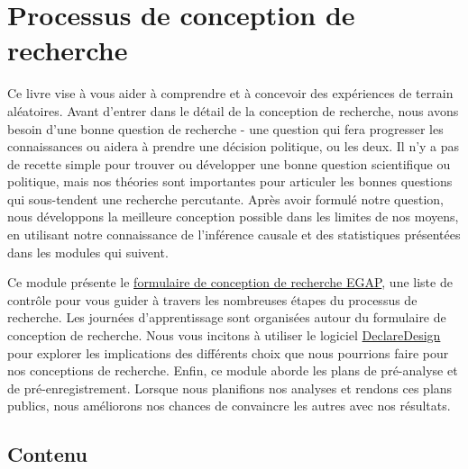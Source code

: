 \documentclass[12pt,]{book}
\begin{document}
\hypertarget{processus-de-conception-de-recherche}{%
\chapter{Processus de conception de recherche}\label{processus-de-conception-de-recherche}}

Ce livre vise à vous aider à comprendre et à concevoir des expériences de terrain aléatoires. Avant d'entrer dans le détail de la conception de recherche, nous avons besoin d'une bonne question de recherche - une question qui fera progresser les connaissances ou aidera à prendre une décision politique, ou les deux. Il n'y a pas de recette simple pour trouver ou développer une bonne question scientifique ou politique, mais nos théories sont importantes pour articuler les bonnes questions qui sous-tendent une recherche percutante. Après avoir formulé notre question, nous développons la meilleure conception possible dans les limites de nos moyens, en utilisant notre connaissance de l'inférence causale et des statistiques présentées dans les modules qui suivent.

Ce module présente le \href{https://egap.github.io/learningdays-resources/Exercises/design-form.Rmd}{formulaire de conception de recherche EGAP}, une liste de contrôle pour vous guider à travers les nombreuses étapes du processus de recherche. Les journées d'apprentissage sont organisées autour du formulaire de conception de recherche. Nous vous incitons à utiliser le logiciel \href{https://declaredesign.org}{DeclareDesign} pour explorer les implications des différents choix que nous pourrions faire pour nos conceptions de recherche. Enfin, ce module aborde les plans de pré-analyse et de pré-enregistrement. Lorsque nous planifions nos analyses et rendons ces plans publics, nous améliorons nos chances de convaincre les autres avec nos résultats.

\hypertarget{contenu}{%
\section{Contenu}\label{contenu}}
\end{document}
